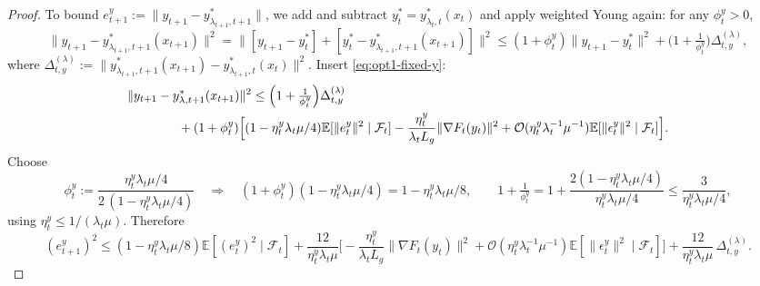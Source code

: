 \documentclass{uai2026} %
\begin{document}
\begin{proof}
To bound $e_{t+1}^{y}:=\|y_{t+1}-y^{*}_{\lambda_{t+1},t+1}\|$, we add and subtract $y^{*}_{t}=y^{*}_{\lambda_{t},t}(x_{t})$ and apply weighted Young again: for any $\phi_t^y>0$,
\[
\|y_{t+1}-y^{*}_{\lambda_{t+1},t+1}(x_{t+1})\|^2
=\|[y_{t+1}-y_t^{*}]+[y_t^{*}-y^{*}_{\lambda_{t+1},t+1}(x_{t+1})]\|^2
\le (1+\phi_t^y)\|y_{t+1}-y_t^{*}\|^2+\Big(1+\tfrac{1}{\phi_t^y}\Big)\Delta^{(\lambda)}_{t,y},
\]
where $\Delta^{(\lambda)}_{t,y}:=\|y^{*}_{\lambda_{t+1},t+1}(x_{t+1})-y^{*}_{\lambda_{t+1},t}(x_t)\|^2$.
Insert \eqref{eq:opt1-fixed-y}:
\begin{align*}
\MoveEqLeft[4]\|y_{t+1}-y^{*}_{\lambda,t+1}(x_{t+1})\|^2
\le \Big(1+\tfrac{1}{\phi_t^y}\Big)\Delta^{(\lambda)}_{t,y}\nonumber\\
&+(1+\phi_t^y)\Big[(1-\eta_{t}^{y}\lambda_{t}\mu/4)\mathbb{E}[\|e_{t}^{y}\|^{2}\mid\mathcal{F}_{t}]-\frac{\eta_{t}^{y}}{\lambda_{t}L_{g}}\|\nabla F_{t}(y_{t})\|^{2}+\mathcal{O}(\eta_{t}^{y}\lambda_{t}^{-1}\mu^{-1})\mathbb{E}[\|\epsilon_{t}^{y}\|^{2}\mid \mathcal{F}_{t}]\Big].
\end{align*}
Choose
\[
\phi_t^y:=\frac{\eta_t^y \lambda_{t}\mu/4}{2\,(1-\eta_t^y \lambda_{t}\mu/4)}
\quad\Rightarrow\quad
(1+\phi_t^y)(1-\eta_t^y \lambda_{t}\mu/4)=1-\eta_t^y \lambda_{t}\mu/8,
\qquad
1+\tfrac{1}{\phi_t^y}=1+\frac{2(1-\eta_t^y \lambda_{t}\mu/4)}{\eta_t^y \lambda_{t}\mu/4}\le \frac{3}{\eta_t^y \lambda_{t}\mu/4},
\]
using $\eta_t^y\le 1/(\lambda_{t}\mu)$. Therefore
\begin{equation}\label{eq:y-next-target-opt1}
(e_{t+1}^{y})^{2}
\le (1-\eta_{t}^{y}\lambda_{t}\mu/8)\mathbb{E}[(e_{t}^{y})^{2}\mid\mathcal{F}_{t}]
+\frac{12}{\eta_{t}^{y}\lambda_{t}\mu}\Big[-\frac{\eta_{t}^{y}}{\lambda_{t}L_{g}}\|\nabla F_{t}(y_{t})\|^{2}+\mathcal{O}(\eta_{t}^{y}\lambda_{t}^{-1}\mu^{-1})\mathbb{E}[\|\epsilon_{t}^{y}\|^{2}\mid \mathcal{F}_{t}]\Big]+ \frac{12}{
\eta_t^y \lambda_{t}\mu}\,\Delta^{(\lambda)}_{t,y}
.
\end{equation}



\end{proof}
\end{document}
